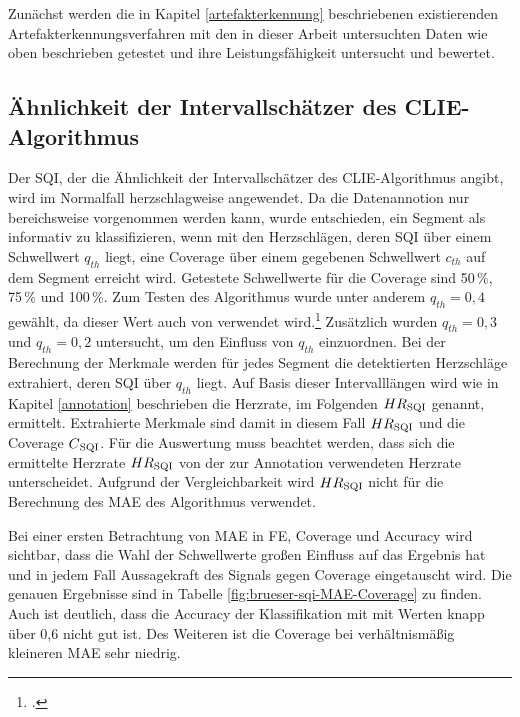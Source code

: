 Zunächst werden die in Kapitel \ref{artefakterkennung} beschriebenen existierenden Artefakterkennungsverfahren mit den in dieser Arbeit untersuchten Daten wie oben beschrieben getestet und ihre Leistungsfähigkeit untersucht und bewertet.

\subsection{Ähnlichkeit der Intervallschätzer des CLIE-Algorithmus}\label{eval-brueser}

Der \ac{SQI}, der die Ähnlichkeit der Intervallschätzer des \ac{CLIE}-Algorithmus angibt, wird im Normalfall herzschlagweise angewendet. Da die Datenannotion nur bereichsweise vorgenommen werden kann, wurde entschieden, ein Segment als informativ zu klassifizieren, wenn mit den Herzschlägen, deren \ac{SQI} über einem Schwellwert $q_{th}$ liegt, eine Coverage über einem gegebenen Schwellwert $c_{th}$ auf dem Segment erreicht wird. %
Getestete Schwellwerte für die Coverage sind 50\,\%, 75\,\% und 100\,\%. Zum Testen des Algorithmus wurde unter anderem $q_{th} = 0{,}4$ gewählt, da dieser Wert auch von \citeauthor{Zink2017} verwendet wird.\footcite[]{Zink2017} Zusätzlich wurden $q_{th} = 0{,}3$ und $q_{th} = 0{,}2$ untersucht, um den Einfluss von $q_{th}$ einzuordnen. Bei der Berechnung der Merkmale werden für jedes Segment die detektierten Herzschläge extrahiert, deren \ac{SQI} über $q_{th}$ liegt. Auf Basis dieser Intervalllängen wird wie in Kapitel \ref{annotation} beschrieben die Herzrate, im Folgenden $HR\textsubscript{SQI}$ genannt, ermittelt. Extrahierte Merkmale sind damit in diesem Fall $HR\textsubscript{SQI}$ und die Coverage $C\textsubscript{SQI}$. Für die Auswertung muss beachtet werden, dass sich die ermittelte Herzrate $HR\textsubscript{SQI}$ von der zur Annotation verwendeten Herzrate unterscheidet. Aufgrund der Vergleichbarkeit wird $HR\textsubscript{SQI}$ nicht für die Berechnung des \ac{MAE} des Algorithmus verwendet.

Bei einer ersten Betrachtung von \ac{MAE} in \si{FE}, Coverage und Accuracy wird sichtbar, dass die Wahl der Schwellwerte großen Einfluss auf das Ergebnis hat und in jedem Fall Aussagekraft des Signals gegen Coverage eingetauscht wird. Die genauen Ergebnisse sind in Tabelle \ref{fig:brueser-sqi-MAE-Coverage} zu finden. Auch ist deutlich, dass die Accuracy der Klassifikation mit mit Werten knapp über 0{,}6 nicht gut ist. Des Weiteren ist die Coverage bei verhältnismäßig kleineren \ac{MAE} sehr niedrig.
 
